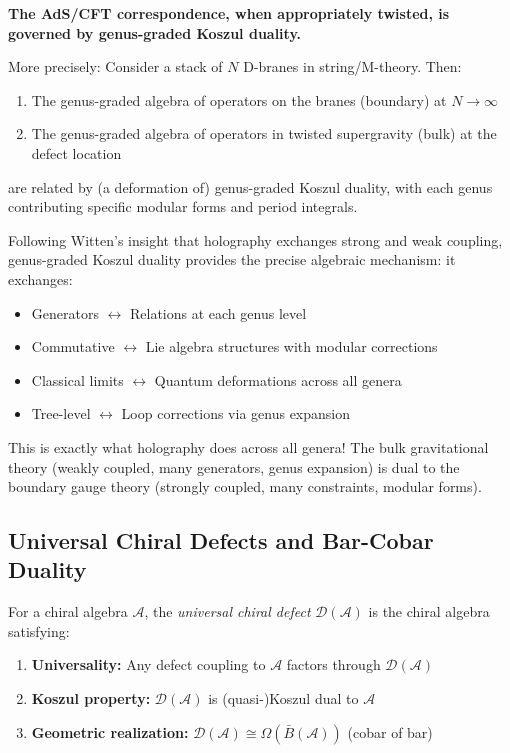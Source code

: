 \begin{principle}\label{principle:costello-li}
\textbf{The AdS/CFT correspondence, when appropriately twisted, is governed by genus-graded Koszul duality.}

More precisely: Consider a stack of $N$ D-branes in string/M-theory. Then:
\begin{enumerate}
\item The genus-graded algebra of operators on the branes (boundary) at $N \to \infty$
\item The genus-graded algebra of operators in twisted supergravity (bulk) at the defect location
\end{enumerate}
are related by (a deformation of) genus-graded Koszul duality, with each genus contributing specific modular forms and period integrals.
\end{principle}

\begin{remark}
Following Witten's insight that holography exchanges strong and weak coupling, genus-graded Koszul duality provides the precise algebraic mechanism: it exchanges:
\begin{itemize}
\item Generators $\leftrightarrow$ Relations at each genus level
\item Commutative $\leftrightarrow$ Lie algebra structures with modular corrections
\item Classical limits $\leftrightarrow$ Quantum deformations across all genera
\item Tree-level $\leftrightarrow$ Loop corrections via genus expansion
\end{itemize}
This is exactly what holography does across all genera! The bulk gravitational theory (weakly coupled, many generators, genus expansion) is dual to the boundary gauge theory (strongly coupled, many constraints, modular forms).
\end{remark}

\subsection{Universal Chiral Defects and Bar-Cobar Duality}

\begin{definition}\label{def:universal-defect}
For a chiral algebra $\mathcal{A}$, the \emph{universal chiral defect} $\mathcal{D}(\mathcal{A})$ is the chiral algebra satisfying:
\begin{enumerate}
\item \textbf{Universality:} Any defect coupling to $\mathcal{A}$ factors through $\mathcal{D}(\mathcal{A})$
\item \textbf{Koszul property:} $\mathcal{D}(\mathcal{A})$ is (quasi-)Koszul dual to $\mathcal{A}$
\item \textbf{Geometric realization:} $\mathcal{D}(\mathcal{A}) \cong \Omega(\bar{B}(\mathcal{A}))$ (cobar of bar)
\end{enumerate}
\end{definition}

